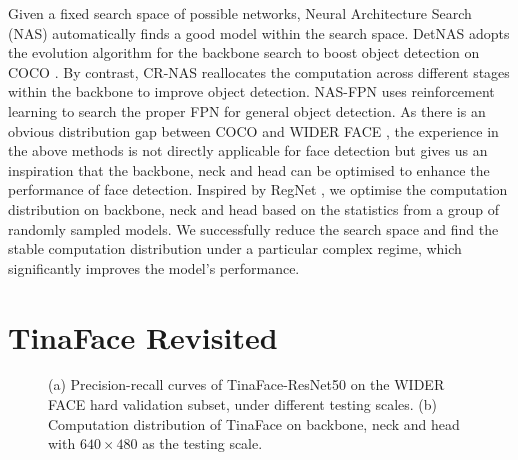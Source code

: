 \documentclass[10pt,twocolumn,letterpaper]{article}
\begin{document}
 Given a fixed search space of possible networks, Neural Architecture Search (NAS) automatically finds a good model within the search space. DetNAS \cite{chen2019detnas} adopts the evolution algorithm for the backbone search to boost object detection on COCO \cite{lin2014microsoft}. By contrast, CR-NAS \cite{liang2019computation} reallocates the computation across different stages within the backbone to improve object detection. NAS-FPN \cite{ghiasi2019fpn} uses reinforcement learning to search the proper FPN for general object detection. As there is an obvious distribution gap between COCO \cite{lin2014microsoft} and WIDER FACE \cite{yang2016wider}, the experience in the above methods is not directly applicable for face detection but gives us an inspiration that the backbone, neck and head can be optimised to enhance the performance of face detection. Inspired by RegNet \cite{radosavovic2020designing}, we optimise the computation distribution on backbone, neck and head based on the statistics from a group of randomly sampled models. We successfully reduce the search space and find the stable computation distribution under a particular complex regime, which significantly improves the model's performance.

\section{TinaFace Revisited}

\begin{figure*}[t!]
\centering
{}
\caption{(a) Precision-recall curves of TinaFace-ResNet50 on the WIDER FACE hard validation subset, under different testing scales. (b) Computation distribution of TinaFace on backbone, neck and head with $640\times480$ as the testing scale.}
\vspace{-4mm}
\label{fig:tinafacerevisited}
\end{figure*}

\begin{table}[t]
\small
\centering
{}
\caption{Performance and computation comparisons of TinaFace under different testing scales. The average scale of original images is around $882\times1024$.}
\label{tab:tinafacedifscale}
\end{table}
\end{document}
